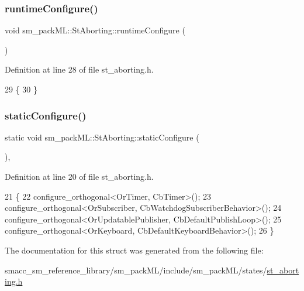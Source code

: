 \subsubsection{\texorpdfstring{runtime\+Configure()}{runtimeConfigure()}}
{\footnotesize\ttfamily void sm\+\_\+pack\+M\+L\+::\+St\+Aborting\+::runtime\+Configure (\begin{DoxyParamCaption}{ }\end{DoxyParamCaption})\hspace{0.3cm}{\ttfamily [inline]}}



Definition at line 28 of file st\+\_\+aborting.\+h.


\begin{DoxyCode}
29     \{
30     \}
\end{DoxyCode}
\mbox{\label{structsm__packML_1_1StAborting_a5aee0e07b9d76338736e549f39e6784a}} 
\subsubsection{\texorpdfstring{static\+Configure()}{staticConfigure()}}
{\footnotesize\ttfamily static void sm\+\_\+pack\+M\+L\+::\+St\+Aborting\+::static\+Configure (\begin{DoxyParamCaption}{ }\end{DoxyParamCaption})\hspace{0.3cm}{\ttfamily [inline]}, {\ttfamily [static]}}



Definition at line 20 of file st\+\_\+aborting.\+h.


\begin{DoxyCode}
21     \{
22         configure\_orthogonal<OrTimer, CbTimer>();   
23         configure\_orthogonal<OrSubscriber, CbWatchdogSubscriberBehavior>();
24         configure\_orthogonal<OrUpdatablePublisher, CbDefaultPublishLoop>();
25         configure\_orthogonal<OrKeyboard, CbDefaultKeyboardBehavior>();
26     \}
\end{DoxyCode}


The documentation for this struct was generated from the following file\+:\begin{DoxyCompactItemize}
\item 
smacc\+\_\+sm\+\_\+reference\+\_\+library/sm\+\_\+pack\+M\+L/include/sm\+\_\+pack\+M\+L/states/\hyperlink{st__aborting_8h}{st\+\_\+aborting.\+h}\end{DoxyCompactItemize}
